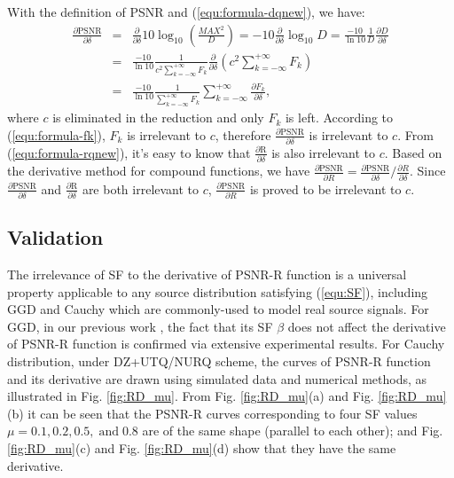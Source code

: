 \documentclass[smallabstract,smallcaptions]{dccpaper}
\begin{document}
With the definition of PSNR and (\ref{equ:formula-dqnew}), we have:
\begin{eqnarray*}
\frac{\partial\text{PSNR}}{\partial\delta}
&=&\frac{\partial}{\partial\delta}10 \log_{10}\left(\frac{MAX^2}{D}\right)
=-10\frac{\partial}{\partial\delta}\log_{10}D
=\frac{-10}{\ln{10}}\frac{1}{D}\frac{\partial D}{\partial\delta}
\\&=&\frac{-10}{\ln{10}}\frac{1}{c^2 \sum_{k=-\infty}^{+\infty} F_k}\frac{\partial}{\partial\delta} \left(c^2 \sum_{k=-\infty}^{+\infty} F_k\right)
\\&=&\frac{-10}{\ln{10}}\frac{1}{\sum_{k=-\infty}^{+\infty} F_k}\sum_{k=-\infty}^{+\infty} \frac{\partial F_k}{\partial\delta},
\end{eqnarray*}
where $c$ is eliminated in the reduction and only $F_k$ is left. According to (\ref{equ:formula-fk}), $F_k$ is irrelevant to $c$, therefore $\frac{\partial\textrm{PSNR}}{\partial\delta}$ is irrelevant to $c$. From (\ref{equ:formula-rqnew}), it's easy to know that $\frac{\partial\textrm{R}}{\partial\delta}$ is also irrelevant to $c$. Based on the derivative method for compound functions, we have $\frac{\partial\textrm{PSNR}}{\partial R} = \frac{\partial\textrm{PSNR}}{\partial\delta}/\frac{\partial R}{\partial\delta}$. Since $\frac{\partial\textrm{PSNR}}{\partial\delta}$ and $\frac{\partial\textrm{R}}{\partial\delta}$ are both irrelevant to $c$, $\frac{\partial\textrm{PSNR}}{\partial R}$ is proved to be irrelevant to $c$.

\subsection{Validation}

The irrelevance of SF to the derivative of PSNR-R function is a universal property applicable to any source distribution satisfying (\ref{equ:SF}), including GGD and Cauchy which are commonly-used to model real source signals. For GGD, in our previous work \cite{Sun_TCSVT2009}, the fact that its SF $\beta$ does not affect the derivative of PSNR-R function is confirmed via extensive experimental results. For Cauchy distribution, under DZ+UTQ/NURQ scheme, the curves of PSNR-R function and its derivative are drawn using simulated data and numerical methods, as illustrated in Fig. \ref{fig:RD_mu}. From Fig. \ref{fig:RD_mu}(a) and Fig. \ref{fig:RD_mu}(b) it can be seen that the PSNR-R curves corresponding to four SF values $\mu = 0.1, 0.2, 0.5, \; \textrm{and} \;0.8$ are of the same shape (parallel to each other); and Fig.\ref{fig:RD_mu}(c) and Fig. \ref{fig:RD_mu}(d) show that they have the same derivative.
\end{document}

